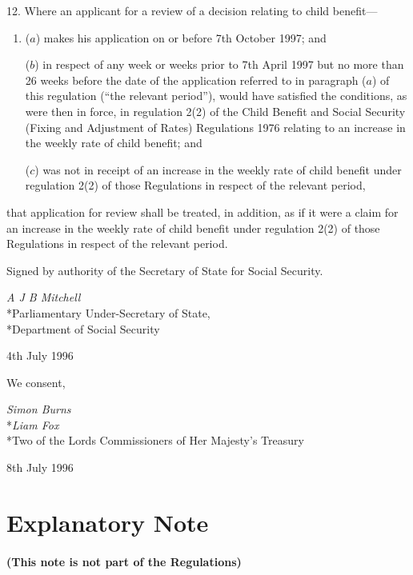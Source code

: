 \documentclass[a4paper]{article}
\newcommand{\parthead}{}
\begin{document}
12.  Where an applicant for a review of a decision relating to child benefit—
\begin{enumerate}\item[]
($a$) makes his application on or before 7th October 1997; and

($b$) in respect of any week or weeks prior to 7th April 1997 but no more than 26 weeks before the date of the application referred to in paragraph ($a$) of this regulation (“the relevant period”), would have satisfied the conditions, as were then in force, in regulation 2(2) of the Child Benefit and Social Security (Fixing and Adjustment of Rates) Regulations 1976 relating to an increase in the weekly rate of child benefit; and

($c$) was not in receipt of an increase in the weekly rate of child benefit under regulation 2(2) of those Regulations in respect of the relevant period,
\end{enumerate}
that application for review shall be treated, in addition, as if it were a claim for an increase in the weekly rate of child benefit under regulation 2(2) of those Regulations in respect of the relevant period.

\bigskip

Signed by authority of the Secretary of State for Social Security.

{\raggedleft
\emph{A J B Mitchell}\\*Parliamentary Under-Secretary of State,\\*Department of Social Security

}

4th July 1996

\bigskip

We consent,

{\raggedleft
\emph{Simon Burns}\\*\emph{Liam Fox}\\*Two of the Lords Commissioners of Her Majesty’s Treasury

}

8th July 1996

\part{Explanatory Note}

\renewcommand\parthead{--- Explanatory Note}

\subsection*{(This note is not part of the Regulations)}
\end{document}
